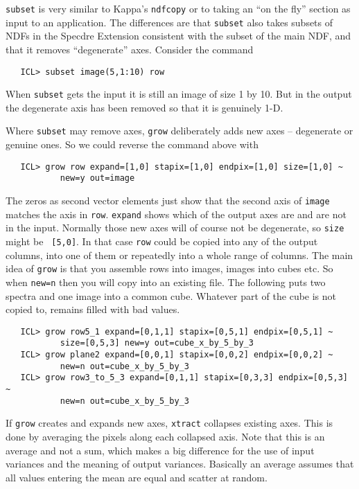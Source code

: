 {\tt subset} is very similar to Kappa's {\tt ndfcopy} or to taking an
``on the fly'' section as input to an application.  The differences are
that {\tt subset} also takes subsets of NDFs in the Specdre
Extension consistent with the subset of the main NDF,
and that it removes ``degenerate'' axes.  Consider the command

\begin{verbatim}
   ICL> subset image(5,1:10) row
\end{verbatim}

When {\tt subset} gets the input it is still an image of size 1 by
10.  But in the output the degenerate axis has been removed so that it
is genuinely 1-D.

Where {\tt subset} may remove axes, {\tt grow} deliberately adds new
axes -- degenerate or genuine ones.  So we could reverse the command
above with

\begin{verbatim}
   ICL> grow row expand=[1,0] stapix=[1,0] endpix=[1,0] size=[1,0] ~
           new=y out=image
\end{verbatim}

The zeros as second vector elements just show that the second axis of
{\tt image} matches the axis in {\tt row}.  {\tt expand} shows which
of the output axes are and are not in the input.  Normally those new
axes will of course not be degenerate, so {\tt size} might be {\tt
[5,0]}.  In that case {\tt row} could be copied into any of the
output columns, into one of them or repeatedly into a whole range of
columns.  The main idea of {\tt grow} is that you assemble rows into
images, images into cubes etc.  So when {\tt new=n} then you will
copy into an existing file.  The following puts two spectra and one
image into a common cube.  Whatever part of the cube is not copied to,
remains filled with bad values.

\begin{verbatim}
   ICL> grow row5_1 expand=[0,1,1] stapix=[0,5,1] endpix=[0,5,1] ~
           size=[0,5,3] new=y out=cube_x_by_5_by_3
   ICL> grow plane2 expand=[0,0,1] stapix=[0,0,2] endpix=[0,0,2] ~
           new=n out=cube_x_by_5_by_3
   ICL> grow row3_to_5_3 expand=[0,1,1] stapix=[0,3,3] endpix=[0,5,3] ~
           new=n out=cube_x_by_5_by_3
\end{verbatim}


If {\tt grow} creates and expands new axes, {\tt xtract} collapses
existing axes.  This is done by averaging the pixels along each
collapsed axis.  Note that this is an average and not a sum, which
makes a big difference for the use of input variances and the meaning
of output variances.  Basically an average assumes that all values
entering the mean are equal and scatter at random.

